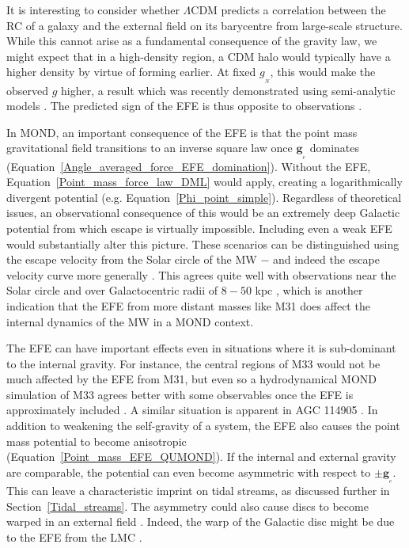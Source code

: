 \documentclass[fleqn,usenatbib,useAMS]{mnras} %
\begin{document}
It is interesting to consider whether $\Lambda$CDM predicts a correlation between the RC of a galaxy and the external field on its barycentre from large-scale structure. While this cannot arise as a fundamental consequence of the gravity law, we might expect that in a high-density region, a CDM halo would typically have a higher density by virtue of forming earlier. At fixed $g_{_N}$, this would make the observed $g$ higher, a result which was recently demonstrated using semi-analytic models \citep{Paranjape_2022}. The predicted sign of the EFE is thus opposite to observations \citep{Chae_2020_EFE, Chae_2021}.

In MOND, an important consequence of the EFE is that the point mass gravitational field transitions to an inverse square law once $\bm{g}_{_e}$ dominates (Equation~\ref{Angle_averaged_force_EFE_domination}). Without the EFE, Equation~\ref{Point_mass_force_law_DML} would apply, creating a logarithmically divergent potential (e.g. Equation~\ref{Phi_point_simple}). Regardless of theoretical issues, an observational consequence of this would be an extremely deep Galactic potential from which escape is virtually impossible. Including even a weak EFE would substantially alter this picture. These scenarios can be distinguished using the escape velocity from the Solar circle of the MW \citep{Famaey_2007, Wu_2008} $-$ and indeed the escape velocity curve more generally \citep{Banik_2018_escape}. This agrees quite well with observations near the Solar circle \citep{Monari_2018} and over Galactocentric radii of $8-50$ kpc \citep{Williams_2017}, which is another indication that the EFE from more distant masses like M31 does affect the internal dynamics of the MW in a MOND context.

The EFE can have important effects even in situations where it is sub-dominant to the internal gravity. For instance, the central regions of M33 would not be much affected by the EFE from M31, but even so a hydrodynamical MOND simulation of M33 agrees better with some observables once the EFE is approximately included \citep{Banik_2020_M33}. A similar situation is apparent in AGC 114905 \citep{Banik_2022_fake_inclination}. In addition to weakening the self-gravity of a system, the EFE also causes the point mass potential to become anisotropic (Equation~\ref{Point_mass_EFE_QUMOND}). If the internal and external gravity are comparable, the potential can even become asymmetric with respect to $\pm \bm{g}_{_e}$. This can leave a characteristic imprint on tidal streams, as discussed further in Section~\ref{Tidal_streams}. The asymmetry could also cause discs to become warped in an external field \citep{Banik_2020_M33}. Indeed, the warp of the Galactic disc might be due to the EFE from the LMC \citep{Brada_2000_warp}.
\end{document}
